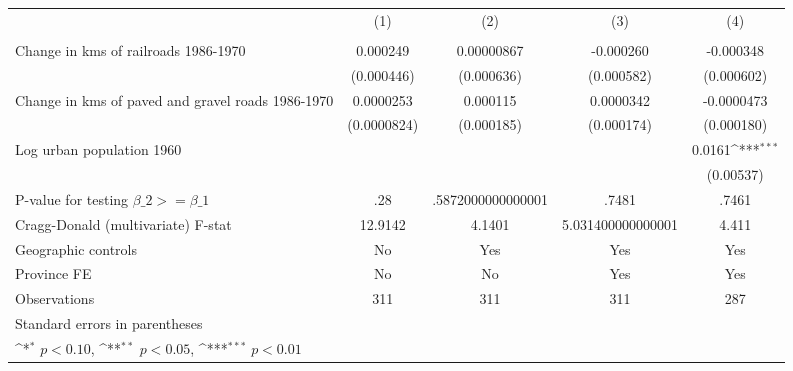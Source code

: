 {
\def\sym#1{\ifmmode^{#1}\else\(^{#1}\)\fi}
\begin{tabular}{l*{4}{c}}
\hline\hline
                &\multicolumn{1}{c}{(1)}&\multicolumn{1}{c}{(2)}&\multicolumn{1}{c}{(3)}&\multicolumn{1}{c}{(4)}\\
                &\multicolumn{1}{c}{}&\multicolumn{1}{c}{}&\multicolumn{1}{c}{}&\multicolumn{1}{c}{}\\
\hline
Change in kms of railroads 1986-1970& 0.000249         &0.00000867         &-0.000260         &-0.000348         \\
                &(0.000446)         &(0.000636)         &(0.000582)         &(0.000602)         \\
[1em]
Change in kms of paved and gravel roads 1986-1970&0.0000253         & 0.000115         &0.0000342         &-0.0000473         \\
                &(0.0000824)         &(0.000185)         &(0.000174)         &(0.000180)         \\
[1em]
Log urban population 1960&                  &                  &                  &   0.0161\sym{***}\\
                &                  &                  &                  &(0.00537)         \\
\hline
P-value for testing $\beta\_{2} >= \beta\_{1}$&      .28         &.5872000000000001         &    .7481         &    .7461         \\
Cragg-Donald (multivariate) F-stat&  12.9142         &   4.1401         &5.031400000000001         &    4.411         \\
Geographic controls&       No         &      Yes         &      Yes         &      Yes         \\
Province FE     &       No         &       No         &      Yes         &      Yes         \\
Observations    &      311         &      311         &      311         &      287         \\
\hline\hline
\multicolumn{5}{l}{\footnotesize Standard errors in parentheses}\\
\multicolumn{5}{l}{\footnotesize \sym{*} \(p<0.10\), \sym{**} \(p<0.05\), \sym{***} \(p<0.01\)}\\
\end{tabular}
}
